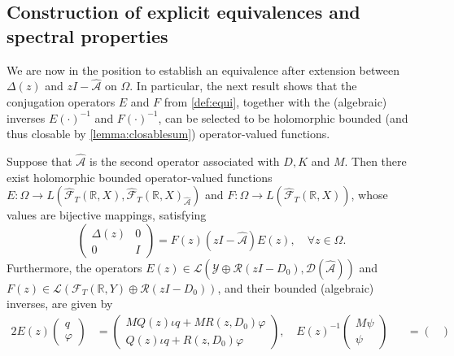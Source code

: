 \documentclass[english]{myarticle}
\begin{document}
\begin{sloppypar}
\subsection{Construction of explicit equivalences and spectral properties} \label{subsec:equivalencescheme}

We are now in the position to establish an equivalence after extension between $\Delta(z)$ and $zI - \hat{\mathcal{A}}$ on $\Omega$. In particular, the next result shows that the conjugation operators $E$ and $F$ from \cref{def:equi}, together with the (algebraic) inverses $E(\cdot)^{-1}$ and $F(\cdot)^{-1}$, can be selected to be holomorphic bounded (and thus closable by \cref{lemma:closablesum}) operator-valued functions.

\begin{theorem} \label{thm:Delta equivalence}
Suppose that $\hat{\mathcal{A}}$ is the second operator associated with $D, K$ and $M$. Then there exist holomorphic bounded operator-valued functions $E : \Omega \to L(\hat{\mathcal{F}}_T(\mathbb{R},X),\hat{\mathcal{F}}_T(\mathbb{R},X)_{\hat{\mathcal{A}}})$ and $F : \Omega \to L(\hat{\mathcal{F}}_T(\mathbb{R},X))$, whose values are bijective mappings, satisfying
\begin{equation} \label{eq:Delta_equivalence}
    \begin{pmatrix}
        \Delta(z) & 0 \\
        0 & I 
    \end{pmatrix}
    =
    F(z)(z I - \hat{\mathcal{A}})E(z), \quad \forall z \in \Omega.
\end{equation}
Furthermore, the operators $E(z) \in \mathcal{L}(\mathcal{Y} \oplus \mathcal{R}(zI-D_0),\mathcal{D}(\hat{\mathcal{A}}))$ and $F(z) \in \mathcal{L}(\mathcal{F}_T(\mathbb{R},Y) \oplus \mathcal{R}(zI-D_0))$, and their bounded (algebraic) inverses, are given by
\begin{alignat*}{2}
    E(z)
    \begin{pmatrix}
    q\\
    \varphi
    \end{pmatrix}
    &=
    \begin{pmatrix}
    MQ(z)\iota q + MR(z,D_0)\varphi\\
    Q(z)\iota q + R(z,D_0)\varphi
    \end{pmatrix}, \quad E(z)^{-1}
    \begin{pmatrix}
    M\psi\\
    \psi
    \end{pmatrix}
    &&=
    \begin{pmatrix}

\end{pmatrix}
\end{alignat*}
\end{theorem}
\end{sloppypar}
\end{document}
